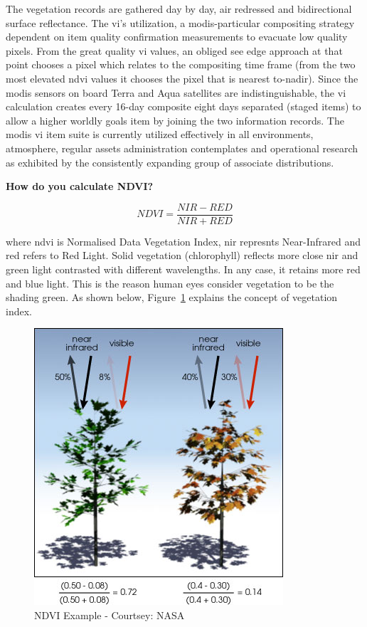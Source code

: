 The vegetation records are gathered day by day, air redressed and bidirectional surface reflectance. The \gls{vi}'s utilization, a \gls{modis}-particular compositing strategy dependent on item quality confirmation measurements to evacuate low quality pixels. From the great quality \gls{vi} values, an obliged see edge approach at that point chooses a pixel which relates to the compositing time frame (from the two most elevated \gls{ndvi} values it chooses the pixel that is nearest to-nadir). Since the \gls{modis} sensors on board Terra and Aqua satellites are indistinguishable, the \gls{vi} calculation creates every 16-day composite eight days separated (staged items) to allow a higher worldly goals item by joining the two information records. The \gls{modis} \gls{vi} item suite is currently utilized effectively in all environments, atmosphere, regular assets administration contemplates and operational research as exhibited by the consistently expanding group of associate distributions. \\

\centerline{\textbf{How do you calculate NDVI?  \cite{theGISGeography}}}

  \begin{equation} \label{eq:ndvi_formula}
       NDVI = \frac{NIR - RED}{NIR + RED}
    \end{equation} 

where \gls{ndvi} is Normalised Data Vegetation Index, \gls{nir} represnts Near-Infrared and \gls{red} refers to Red Light. Solid vegetation (chlorophyll) reflects more close \gls{nir} and green light contrasted with different wavelengths. In any case, it retains more red and blue light. This is the reason human eyes consider vegetation to be the shading green. As shown below, Figure~\ref{fig:ndvi_example} explains the concept of vegetation index.

    \begin{figure}[H]
            \centering
            \includegraphics[width=0.5\linewidth]{figures/ch3/ndvi-example.png}
            \caption{\label{fig:ndvi_example} NDVI Example - Courtsey: NASA \cite{MODIS}}
    \end{figure}

